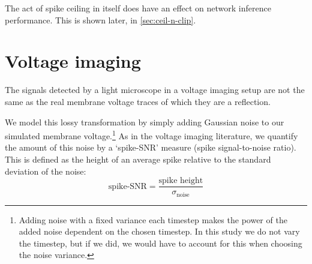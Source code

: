 The act of spike ceiling in itself does have an effect on network inference performance. This is shown later, in \cref{sec:ceil-n-clip}.

\begin{minipage}{\linewidth}

\end{minipage}



\FloatBarrier
\section{Voltage imaging}
\label{sec:model-voltage-imaging}

The signals detected by a light microscope in a voltage imaging setup are not the same as the real membrane voltage traces of which they are a reflection.


We model this lossy transformation by simply adding Gaussian noise to our simulated membrane voltage.\footnote{
    Adding noise with a fixed variance each timestep makes the power of the added noise dependent on the chosen timestep. In this study we do not vary the timestep, but if we did, we would have to account for this when choosing the noise variance.
}
As in the voltage imaging literature, we quantify the amount of this  noise by a `spike-SNR' measure (spike signal-to-noise ratio). This is defined as the height of an average spike relative to the standard deviation of the noise:
\begin{equation}
    \text{spike-SNR} = \frac{\text{spike height}}{σ_\text{noise}}
\end{equation}

